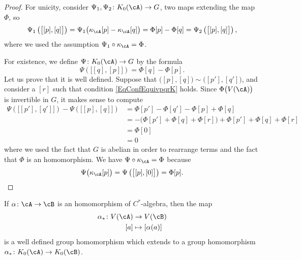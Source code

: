 \begin{proof}
	For unicity, consider $\Psi_1,\Psi_2\colon K_0(\cA)\to G$, two maps extending the map $\Phi$, so
	\begin{equation}
		\Psi_1\left( \big[ [p],[q] \big] \right)=\Psi_1\big( \kappa_{\cA}[p]-\kappa_{\cA}[q] \big)= \Phi[p]-\Phi[q]=\Psi_2\left( \big[ [p],[q] \big] \right),
	\end{equation}
	where we used the assumption $\Psi_1\circ\kappa_{\cA}=\Phi$.

	For existence, we define $\Psi\colon K_0(\cA)\to G$ by the formula
	\begin{equation}
		\Psi\left( \big[ [q],[p] \big] \right)=\Phi[q]-\Phi[p].
	\end{equation}
	Let us prove that it is well defined. Suppose that $\big( [p],[q] \big)\sim \big( [p'],[q'] \big)$, and consider a $[r]$ such that condition \eqref{EqConfEquivpqrK} holds. Since $\Phi\big( V(\cA) \big)$ is invertible in $G$, it makes sense to compute
	\begin{equation}
		\begin{split}
			\Psi\left( \big[ [p'],[q'] \big] \right)-\Psi\left( \big[ [p],[q] \big] \right)&=\Phi[p']-\Phi[q']-\Phi[p]+\Phi[q]\\
			&=-\big( \Phi[p']+\Phi[q]+\Phi[r] \big)+\Phi[p']+\Phi[q]+\Phi[r]\\
			&=\Phi[0]\\
			&=0
		\end{split}
	\end{equation}
	where we used the fact that $G$ is abelian in order to rearrange terms and the fact that $\Phi$ is an homomorphism. We have $\Psi\circ\kappa_{\cA}=\Phi$ because
	\[
		\Psi\big( \kappa_{\cA}[p] \big)=\Psi\left( \big[ [p],[0] \big] \right)=\Phi[p].
	\]
\end{proof}

\begin{proposition}
	If $\alpha\colon \cA\to \cB$ is an homomorphism of $C^*$-algebra, then the map
	\begin{equation}
		\begin{aligned}
			\alpha_*\colon V(\cA) & \to V(\cB)          \\
			[a]                   & \mapsto [\alpha(a)]
		\end{aligned}
	\end{equation}
	is a well defined group homomorphism which extends to a group homomorphism $\alpha_*\colon K_0(\cA)\to K_0(\cB)$.
\end{proposition}


